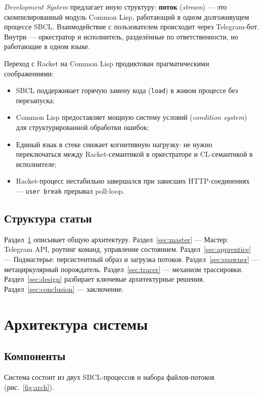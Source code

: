 \documentclass[11pt,a4paper]{article}
\begin{document}
\textit{Development System} предлагает иную структуру: \textbf{поток} (\textit{stream}) — это скомпилированный модуль Common Lisp, работающий в одном долгоживущем процессе SBCL. Взаимодействие с пользователем происходит через Telegram-бот. Внутри — оркестратор и исполнитель, разделённые по ответственности, но работающие в одном языке.

Переход с Racket на Common Lisp продиктован прагматическими соображениями:
\begin{itemize}[noitemsep]
  \item SBCL поддерживает горячую замену кода (\texttt{load}) в живом процессе без перезапуска;
  \item Common Lisp предоставляет мощную систему условий (\textit{condition system}) для структурированной обработки ошибок;
  \item Единый язык в стеке снижает когнитивную нагрузку: не нужно переключаться между Racket-семантикой в оркестраторе и CL-семантикой в исполнителе;
  \item Racket-процесс нестабильно завершался при зависших HTTP-соединениях — \texttt{user break} прерывал poll-loop.
\end{itemize}

\subsection{Структура статьи}

Раздел~\ref{sec:arch} описывает общую архитектуру. Раздел~\ref{sec:master} — Мастер: Telegram API, роутинг команд, управление состоянием. Раздел~\ref{sec:apprentice} — Подмастерье: персистентный образ и загрузка потоков. Раздел~\ref{sec:spawner} — метациркулярный порождатель. Раздел~\ref{sec:tracer} — механизм трассировки. Раздел~\ref{sec:design} разбирает ключевые архитектурные решения. Раздел~\ref{sec:conclusion} — заключение.

\section{Архитектура системы}
\label{sec:arch}

\subsection{Компоненты}

Система состоит из двух SBCL-процессов и набора файлов-потоков (рис.~\ref{fig:arch}).
\end{document}
